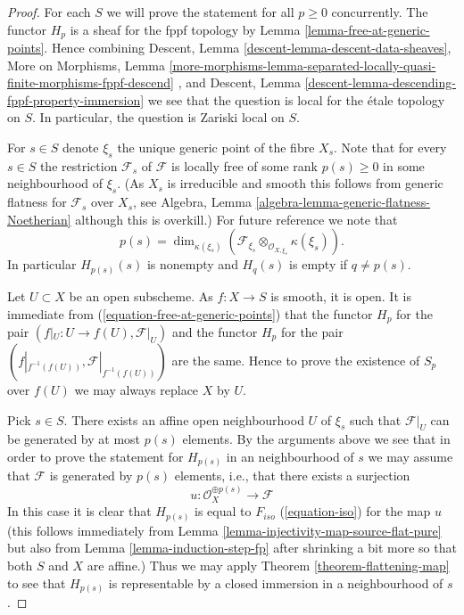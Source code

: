 \begin{proof}
For each $S$ we will prove the statement for all $p \geq 0$ concurrently.
The functor $H_p$ is a sheaf for the fppf topology by
Lemma \ref{lemma-free-at-generic-points}.
Hence combining
Descent, Lemma \ref{descent-lemma-descent-data-sheaves},
More on Morphisms, Lemma
\ref{more-morphisms-lemma-separated-locally-quasi-finite-morphisms-fppf-descend}
, and
Descent, Lemma \ref{descent-lemma-descending-fppf-property-immersion}
we see that the question is local for the \'etale topology on $S$.
In particular, the question is Zariski local on $S$.

\medskip\noindent
For $s \in S$ denote $\xi_s$ the unique generic point of the fibre $X_s$.
Note that for every $s \in S$ the restriction $\mathcal{F}_s$ of
$\mathcal{F}$ is locally free of some rank $p(s) \geq 0$ in some
neighbourhood of $\xi_s$. (As $X_s$ is irreducible
and smooth this follows from generic flatness for $\mathcal{F}_s$ over
$X_s$, see
Algebra, Lemma \ref{algebra-lemma-generic-flatness-Noetherian}
although this is overkill.) For future reference we note that
$$
p(s) =
\dim_{\kappa(\xi_s)}(
\mathcal{F}_{\xi_s} \otimes_{\mathcal{O}_{X, \xi_s}} \kappa(\xi_s)
).
$$
In particular $H_{p(s)}(s)$ is nonempty and $H_q(s)$ is empty
if $q \not = p(s)$.

\medskip\noindent
Let $U \subset X$ be an open subscheme.
As $f : X \to S$ is smooth, it is open.
It is immediate from (\ref{equation-free-at-generic-points})
that the functor $H_p$ for the pair $(f|_U : U \to f(U), \mathcal{F}|_U)$
and the functor $H_p$ for the pair
$(f|_{f^{-1}(f(U))}, \mathcal{F}|_{f^{-1}(f(U))})$
are the same. Hence to prove the existence of $S_p$ over $f(U)$ we may
always replace $X$ by $U$.

\medskip\noindent
Pick $s \in S$. There exists an affine open neighbourhood $U$
of $\xi_s$ such that $\mathcal{F}|_U$ can be generated by at most
$p(s)$ elements. By the arguments above we see that in order to prove
the statement for $H_{p(s)}$ in an neighbourhood of $s$ we may assume
that $\mathcal{F}$ is generated by $p(s)$ elements, i.e., that there exists
a surjection
$$
u : \mathcal{O}_X^{\oplus p(s)} \longrightarrow \mathcal{F}
$$
In this case it is clear that $H_{p(s)}$ is equal to $F_{iso}$
(\ref{equation-iso}) for the map $u$ (this follows immediately from
Lemma \ref{lemma-injectivity-map-source-flat-pure}
but also from
Lemma \ref{lemma-induction-step-fp}
after shrinking a bit more so that both $S$ and $X$ are affine.)
Thus we may apply
Theorem \ref{theorem-flattening-map}
to see that $H_{p(s)}$ is representable by a closed immersion in a
neighbourhood of $s$.


\end{proof}
